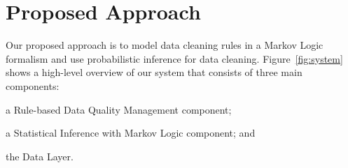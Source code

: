 
\section{Proposed Approach}
\label{sec:method}

Our proposed approach is to model data cleaning rules in a Markov Logic~\cite{domingos2009markov} formalism and use probabilistic inference 
for data cleaning. Figure~\ref{fig:system} shows a high-level overview of our system that consists of three main components: 
\begin{inparaenum}
\item a Rule-based Data Quality Management component;
\item a Statistical Inference with Markov Logic component; and
\item the Data Layer.
\end{inparaenum}
